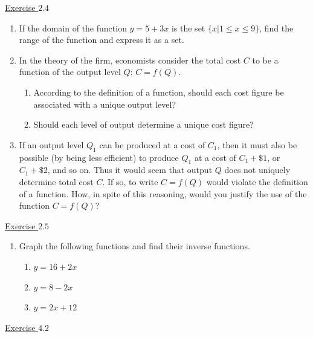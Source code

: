 \underline{Exercise $2.4$} 
\begin{enumerate}
\item[5.] If the domain of the function $y=5+3x$ is the set $\{x | 1 \leq x \leq 9 \}$, find the range of the function and express it as a set.
\item[7.] In the theory of the firm, economists consider the total cost $C$ to be a function of the output level $Q$: $C=f(Q)$.
\begin{enumerate}
\item According to the definition of a function, should each cost figure be associated with a unique output level?
\item Should each level of output determine a unique cost figure?
\end{enumerate}
\item[8.] If an output level $Q_1$ can be produced at a cost of $C_1$, then it must also be possible (by being less efficient) to produce $Q_1$ at a cost of $C_1+\$ 1$, or $C_1+\$ 2$, and so on. Thus it would seem that output $Q$ does not uniquely determine total cost $C$. If so, to write $C=f(Q)$ would violate the definition of a function. How, in spite of this reasoning, would you justify the use of the function $C=f(Q)$? 
\end{enumerate}



\newpage

\underline{Exercise $2.5$} 
\begin{enumerate}
\item Graph the following functions and find their inverse functions.
\begin{enumerate}
	\item $y = 16 + 2x$
	\item $y = 8-2x$
	\item $y = 2x+12 $ 
\end{enumerate}
\end{enumerate}



\underline{Exercise $4.2$} 

